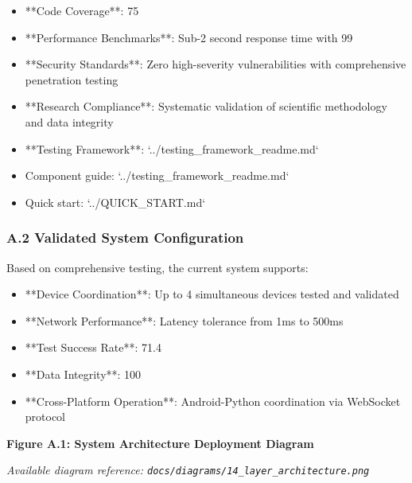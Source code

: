 \documentclass[11pt,a4paper]{article}
\begin{document}
\begin{itemize}
\item **Code Coverage**: 75%
\item **Performance Benchmarks**: Sub-2 second response time with 99%
\item **Security Standards**: Zero high-severity vulnerabilities with comprehensive penetration testing
\item **Research Compliance**: Systematic validation of scientific methodology and data integrity
\item **Testing Framework**: `../testing_framework_readme.md`
\item Component guide: `../testing_framework_readme.md`
\item Quick start: `../QUICK_START.md`

\end{itemize}
\subsubsection{A.2 Validated System Configuration}

Based on comprehensive testing, the current system supports:

\begin{itemize}
\item **Device Coordination**: Up to 4 simultaneous devices tested and validated
\item **Network Performance**: Latency tolerance from 1ms to 500ms
\item **Test Success Rate**: 71.4%
\item **Data Integrity**: 100%
\item **Cross-Platform Operation**: Android-Python coordination via WebSocket protocol

\end{itemize}
\textbf{Figure A.1: System Architecture Deployment Diagram}

\textit{Available diagram reference: \texttt{docs/diagrams/14\_layer\_architecture.png}}
\end{document}
